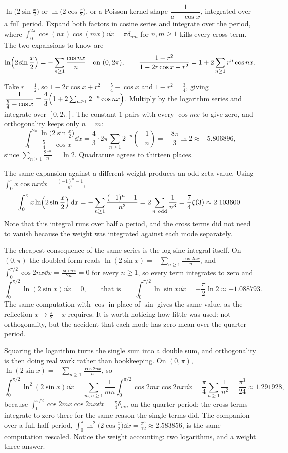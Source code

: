 \cue $\ln\bigl(2\sin\tfrac x2\bigr)$ or $\ln\bigl(2\cos\tfrac x2\bigr)$, or a Poisson kernel shape $\dfrac{1}{a-\cos x}$, integrated over a full period.
\method Expand both factors in cosine series and integrate over the period, where $\int_0^{2\pi}\cos(nx)\cos(mx)\dd x=\pi\delta_{nm}$ for $n,m\geq1$ kills every cross term. The two expansions to know are
\[\ln\Bigl(2\sin\frac x2\Bigr)=-\sum_{n\geq1}\frac{\cos nx}{n}\quad\text{on }(0,2\pi),\qquad \frac{1-r^{2}}{1-2r\cos x+r^{2}}=1+2\sum_{n\geq1}r^{n}\cos nx.\]

\begin{worked}
Take $r=\tfrac12$, so $1-2r\cos x+r^{2}=\tfrac54-\cos x$ and $1-r^{2}=\tfrac34$, giving $\dfrac{1}{\tfrac54-\cos x}=\dfrac43\Bigl(1+2\sum_{n\geq1}2^{-n}\cos nx\Bigr)$. Multiply by the logarithm series and integrate over $[0,2\pi]$. The constant $1$ pairs with every $\cos mx$ to give zero, and orthogonality keeps only $n=m$:
\[\int_0^{2\pi}\frac{\ln\bigl(2\sin\tfrac x2\bigr)}{\tfrac54-\cos x}\dd x=\frac43\cdot2\pi\sum_{n\geq1}2^{-n}\left(-\frac1n\right)=-\frac{8\pi}{3}\ln2\approx-5.806896,\]
since $\sum_{n\geq1}\frac{2^{-n}}{n}=\ln2$. Quadrature agrees to thirteen places.

The same expansion against a different weight produces an odd zeta value. Using $\int_0^{\pi}x\cos nx\dd x=\frac{(-1)^{n}-1}{n^{2}}$,
\[\int_0^{\pi}x\ln\Bigl(2\sin\frac x2\Bigr)\dd x=-\sum_{n\geq1}\frac{(-1)^{n}-1}{n^{3}}=2\sum_{n\ \mathrm{odd}}\frac{1}{n^{3}}=\frac{7}{4}\zeta(3)\approx2.103600.\]
Note that this integral runs over half a period, and the cross terms did not need to vanish because the weight was integrated against each mode separately.

The cheapest consequence of the same series is the log sine integral itself. On $(0,\pi)$ the doubled form reads $\ln(2\sin x)=-\sum_{n\geq1}\frac{\cos2nx}{n}$, and $\int_0^{\pi/2}\cos2nx\dd x=\frac{\sin n\pi}{2n}=0$ for every $n\geq1$, so every term integrates to zero and
\[\int_0^{\pi/2}\ln(2\sin x)\dd x=0,\qquad\text{that is}\qquad \int_0^{\pi/2}\ln\sin x\dd x=-\frac{\pi}{2}\ln2\approx-1.088793.\]
The same computation with $\cos$ in place of $\sin$ gives the same value, as the reflection $x\mapsto\tfrac{\pi}{2}-x$ requires. It is worth noticing how little was used: not orthogonality, but the accident that each mode has zero mean over the quarter period.
\end{worked}

Squaring the logarithm turns the single sum into a double sum, and orthogonality is then doing real work rather than bookkeeping. On $(0,\pi)$, $\ln(2\sin x)=-\sum_{n\geq1}\frac{\cos2nx}{n}$, so
\[\int_0^{\pi/2}\ln^{2}(2\sin x)\dd x=\sum_{m,n\geq1}\frac{1}{mn}\int_0^{\pi/2}\cos2mx\cos2nx\dd x=\frac{\pi}{4}\sum_{n\geq1}\frac{1}{n^{2}}=\frac{\pi^{3}}{24}\approx1.291928,\]
because $\int_0^{\pi/2}\cos2mx\cos2nx\dd x=\tfrac{\pi}{4}\delta_{mn}$ on the quarter period: the cross terms integrate to zero there for the same reason the single terms did. The companion over a full half period, $\int_0^{\pi}\ln^{2}\bigl(2\cos\tfrac x2\bigr)\dd x=\tfrac{\pi^{3}}{12}\approx2.583856$, is the same computation rescaled. Notice the weight accounting: two logarithms, and a weight three answer.

